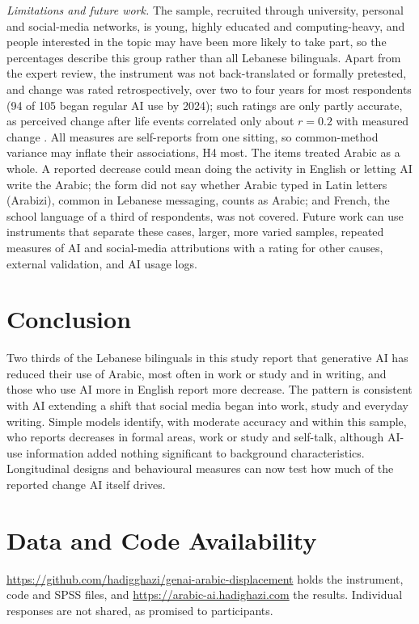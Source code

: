 \documentclass[conference]{IEEEtran}
\begin{document}
\emph{Limitations and future work.} The sample, recruited through university, personal and social-media networks, is young, highly educated and computing-heavy, and people interested in the topic may have been more likely to take part, so the percentages describe this group rather than all Lebanese bilinguals. Apart from the expert review, the instrument was not back-translated or formally pretested, and change was rated retrospectively, over two to four years for most respondents (94 of 105 began regular AI use by 2024); such ratings are only partly accurate, as perceived change after life events correlated only about $r=0.2$ with measured change \cite{schwaba2023}. All measures are self-reports from one sitting, so common-method variance may inflate their associations, H4 most. The items treated Arabic as a whole. A reported decrease could mean doing the activity in English or letting AI write the Arabic; the form did not say whether Arabic typed in Latin letters (Arabizi), common in Lebanese messaging, counts as Arabic; and French, the school language of a third of respondents, was not covered. Future work can use instruments that separate these cases, larger, more varied samples, repeated measures of AI and social-media attributions with a rating for other causes, external validation, and AI usage logs.

\section{Conclusion}

Two thirds of the Lebanese bilinguals in this study report that generative AI has reduced their use of Arabic, most often in work or study and in writing, and those who use AI more in English report more decrease. The pattern is consistent with AI extending a shift that social media began into work, study and everyday writing. Simple models identify, with moderate accuracy and within this sample, who reports decreases in formal areas, work or study and self-talk, although AI-use information added nothing significant to background characteristics. Longitudinal designs and behavioural measures can now test how much of the reported change AI itself drives.

\section*{Data and Code Availability}
{\raggedright \url{https://github.com/hadigghazi/genai-arabic-displacement} holds the instrument, code and SPSS files, and \url{https://arabic-ai.hadighazi.com} the results. Individual responses are not shared, as promised to participants.\par}
\end{document}
